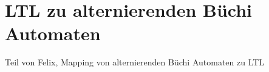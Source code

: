 \section{LTL zu alternierenden Büchi Automaten}

Teil von Felix, Mapping von alternierenden Büchi Automaten zu LTL